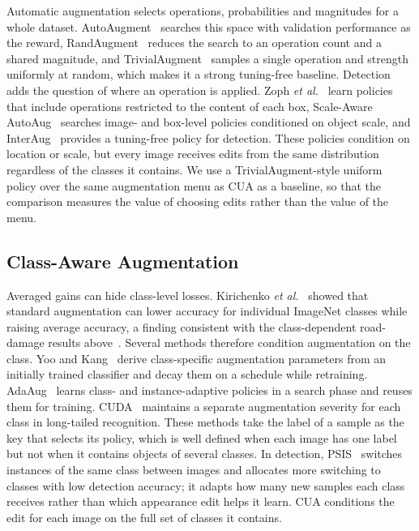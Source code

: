 Automatic augmentation selects operations, probabilities and magnitudes for a whole dataset. AutoAugment~\cite{cubuk2019auto} searches this space with validation performance as the reward, RandAugment~\cite{cubuk2020rand} reduces the search to an operation count and a shared magnitude, and TrivialAugment~\cite{muller2021trivial} samples a single operation and strength uniformly at random, which makes it a strong tuning-free baseline. Detection adds the question of where an operation is applied. Zoph \emph{et al.}~\cite{zoph2020det} learn policies that include operations restricted to the content of each box, Scale-Aware AutoAug~\cite{chen2021scale} searches image- and box-level policies conditioned on object scale, and InterAug~\cite{thopalli2023interaug} provides a tuning-free policy for detection. These policies condition on location or scale, but every image receives edits from the same distribution regardless of the classes it contains. We use a TrivialAugment-style uniform policy over the same augmentation menu as CUA as a baseline, so that the comparison measures the value of choosing edits rather than the value of the menu.

\subsection{Class-Aware Augmentation}

Averaged gains can hide class-level losses. Kirichenko \emph{et al.}~\cite{kirichenko2023} showed that standard augmentation can lower accuracy for individual ImageNet classes while raising average accuracy, a finding consistent with the class-dependent road-damage results above~\cite{tsuchiya2019}. Several methods therefore condition augmentation on the class. Yoo and Kang~\cite{yoo2023} derive class-specific augmentation parameters from an initially trained classifier and decay them on a schedule while retraining. AdaAug~\cite{cheung2022adaaug} learns class- and instance-adaptive policies in a search phase and reuses them for training. CUDA~\cite{ahn2023cuda} maintains a separate augmentation severity for each class in long-tailed recognition. These methods take the label of a sample as the key that selects its policy, which is well defined when each image has one label but not when it contains objects of several classes. In detection, PSIS~\cite{wang2019psis} switches instances of the same class between images and allocates more switching to classes with low detection accuracy; it adapts how many new samples each class receives rather than which appearance edit helps it learn. CUA conditions the edit for each image on the full set of classes it contains.

